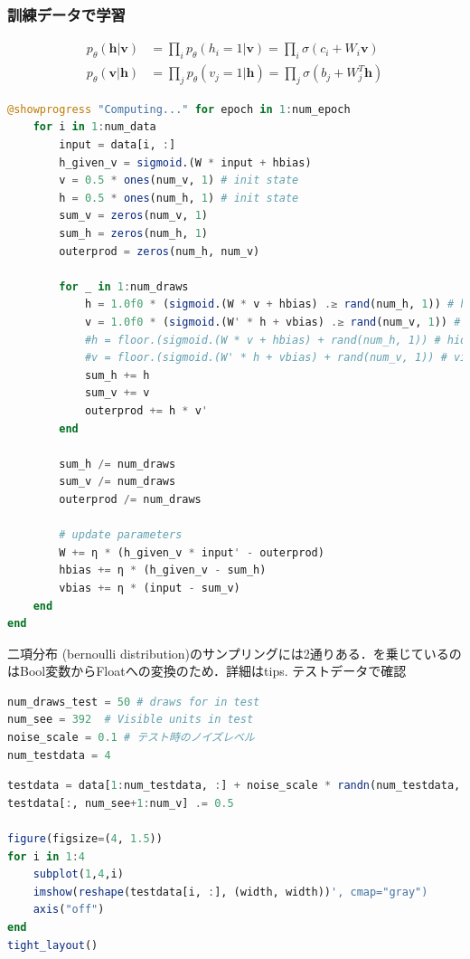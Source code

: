 \subsubsection{訓練データで学習}
\begin{align}
p_\theta(\mathbf{h}|\mathbf{v})&=\prod_i p_\theta(h_i=1|\mathbf{v})=\prod_i \sigma(c_i + W_i \mathbf{v})\\
p_\theta(\mathbf{v}|\mathbf{h})&=\prod_j p_\theta(v_j=1|\mathbf{h})=\prod_j \sigma(b_j + W_j^T \mathbf{h})
\end{align}
\begin{lstlisting}[language=julia]
@showprogress "Computing..." for epoch in 1:num_epoch
    for i in 1:num_data
        input = data[i, :]
        h_given_v = sigmoid.(W * input + hbias)
        v = 0.5 * ones(num_v, 1) # init state
        h = 0.5 * ones(num_h, 1) # init state
        sum_v = zeros(num_v, 1)
        sum_h = zeros(num_h, 1)
        outerprod = zeros(num_h, num_v)

        for _ in 1:num_draws
            h = 1.0f0 * (sigmoid.(W * v + hbias) .≥ rand(num_h, 1)) # hidden 
            v = 1.0f0 * (sigmoid.(W' * h + vbias) .≥ rand(num_v, 1)) # visible
            #h = floor.(sigmoid.(W * v + hbias) + rand(num_h, 1)) # hidden 
            #v = floor.(sigmoid.(W' * h + vbias) + rand(num_v, 1)) # visible
            sum_h += h
            sum_v += v
            outerprod += h * v'
        end
            
        sum_h /= num_draws
        sum_v /= num_draws
        outerprod /= num_draws
        
        # update parameters
        W += η * (h_given_v * input' - outerprod)
        hbias += η * (h_given_v - sum_h)
        vbias += η * (input - sum_v)
    end
end
\end{lstlisting}
二項分布 (bernoulli distribution)のサンプリングには2通りある．を乗じているのはBool変数からFloatへの変換のため．詳細はtips.
テストデータで確認
\begin{lstlisting}[language=julia]
num_draws_test = 50 # draws for in test
num_see = 392  # Visible units in test
noise_scale = 0.1 # テスト時のノイズレベル
num_testdata = 4
\end{lstlisting}
\begin{lstlisting}[language=julia]
testdata = data[1:num_testdata, :] + noise_scale * randn(num_testdata, input_size)
testdata[:, num_see+1:num_v] .= 0.5

figure(figsize=(4, 1.5))
for i in 1:4
    subplot(1,4,i)
    imshow(reshape(testdata[i, :], (width, width))', cmap="gray")
    axis("off")
end
tight_layout()
\end{lstlisting}

